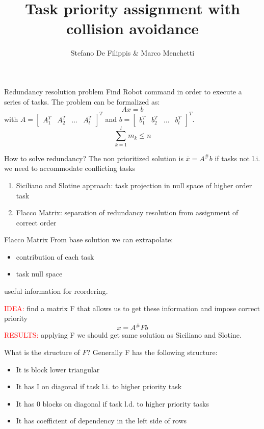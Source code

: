\documentclass[11pt]{beamer}
\author[Stefano, Marco]{Stefano De Filippis \& Marco Menchetti}
\title[ROB2 project]{Task priority assignment with collision avoidance}
\institute[Sapienza]{Sapienza - University of Rome}
\date{}
\begin{document}
\begin{frame}
\titlepage
\end{frame}

\begin{frame}{Redundancy resolution problem}
Find Robot command in order to execute a series of tasks. The problem can be formalized as:
\[
Ax = b
\]
with $A = \begin{bmatrix}
A_1^T & A_2^T & \dots & A_l^T 
\end{bmatrix}^T$ and $
b = \begin{bmatrix}
b_1^T & b_2^T & \dots & b_l^T 
\end{bmatrix}^T
$.
\[
\sum_{k=1}^{l}m_k \leq n
\]
\end{frame}

\begin{frame}{How to solve redundancy?}
The non prioritized solution is $\overline{x} = A^{\#}b$ if tasks not l.i. we need to accommodate conflicting tasks
\begin{enumerate}
\item Siciliano and Slotine approach: task projection in null space of higher order task
\item Flacco Matrix: separation of redundancy resolution from assignment of correct order
\end{enumerate}
\end{frame}

\begin{frame}{Flacco Matrix}
From base solution we can extrapolate:
\begin{itemize}
\item contribution of each task
\item task null space
\end{itemize}
useful information for reordering.

\textcolor{red}{IDEA:} find a matrix F that allows us to get these information and impose correct priority
\[
x = A^{\#}Fb
\]
\textcolor{red}{RESULTS:} applying F we should get same solution as Siciliano and Slotine.
\end{frame}

\begin{frame}{What is the structure of $F$?}
Generally F has the following structure:
\begin{itemize}
\item It is block lower triangular
\item It has I on diagonal if task l.i. to higher priority task
\item It has 0 blocks on diagonal if task l.d. to higher priority tasks
\item It has coefficient of dependency in the left side of rows
\end{itemize}
\end{frame}
\end{document}
